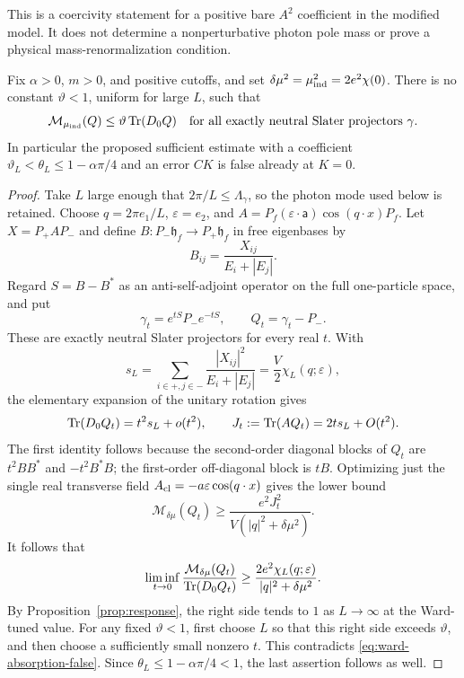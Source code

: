 This is a coercivity statement for a positive bare $A^2$ coefficient in the
modified model.  It does not determine a nonperturbative photon pole mass
or prove a physical mass-renormalization condition.

\begin{proposition}
\label{prop:ward-absorption-false}
Fix $\alpha>0$, $m>0$, and positive cutoffs, and set
$\delta\mu^2=\mu_{\rm ind}^2=2e^2\chi(0)$.
There is no constant $\vartheta<1$, uniform for large $L$, such that
\begin{equation}
 \mathcal M_{\mu_{\rm ind}}(Q)
 \le\vartheta\operatorname{Tr}(D_0Q)
 \quad\text{for all exactly neutral Slater projectors }\gamma.
 \label{eq:ward-absorption-false}
\end{equation}
In particular the proposed sufficient estimate with a coefficient
$\vartheta_L<\theta_L\le1-\alpha\pi/4$ and an error $CK$ is false already
at $K=0$.
\end{proposition}
\begin{proof}
Take $L$ large enough that $2\pi/L\le\Lambda_\gamma$, so the photon mode
used below is retained. Choose $q=2\pi e_1/L$, $\varepsilon=e_2$, and
$A=P_f(\varepsilon\cdot\boldsymbol{\mathsf a})\cos(q\cdot x)P_f$.
Let $X=P_+AP_-$ and define $B:P_-\mathfrak h_f\to P_+\mathfrak h_f$ in
free eigenbases by
\[
 B_{ij}=\frac{X_{ij}}{E_i+|E_j|}.
\]
Regard $S=B-B^*$ as an anti-self-adjoint operator on the full one-particle
space, and put
\[
 \gamma_t=e^{tS}P_-e^{-tS},\qquad Q_t=\gamma_t-P_-.
\]
These are exactly neutral Slater projectors for every real $t$.
With
\[
 s_L=\sum_{i\in+,j\in-}\frac{|X_{ij}|^2}{E_i+|E_j|}
     =\frac V2\chi_L(q;\varepsilon),
\]
the elementary expansion of the unitary rotation gives
\[
 \operatorname{Tr}(D_0Q_t)=t^2s_L+o(t^2),\qquad
 J_t:=\operatorname{Tr}(AQ_t)=2ts_L+O(t^2).
\]
The first identity follows because the second-order diagonal blocks of
$Q_t$ are $t^2BB^*$ and $-t^2B^*B$; the first-order off-diagonal block is
$tB$.  Optimizing just the single real transverse field
$A_{\rm cl}=-a\varepsilon\cos(q\cdot x)$ gives the lower bound
\[
 \mathcal M_{\delta\mu}(Q_t)
 \ge\frac{e^2J_t^2}{V(|q|^2+\delta\mu^2)}.
\]
It follows that
\begin{equation}
 \liminf_{t\to0}
 \frac{\mathcal M_{\delta\mu}(Q_t)}{\operatorname{Tr}(D_0Q_t)}
 \ge\frac{2e^2\chi_L(q;\varepsilon)}{|q|^2+\delta\mu^2}.
 \label{eq:ward-ratio}
\end{equation}
By Proposition~\ref{prop:response}, the right side tends to $1$ as
$L\to\infty$ at the Ward-tuned value.  For any fixed $\vartheta<1$, first
choose $L$ so that this right side exceeds $\vartheta$, and then choose a
sufficiently small nonzero $t$.  This contradicts
\eqref{eq:ward-absorption-false}.  Since
$\theta_L\le1-\alpha\pi/4<1$, the last assertion follows as well.
\end{proof}

